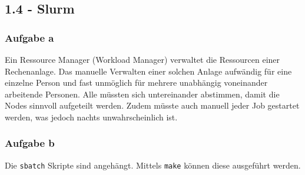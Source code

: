 \subsection*{1.4 - Slurm}

\subsubsection*{Aufgabe a}
Ein Ressource Manager (Workload Manager) verwaltet die Ressourcen einer Rechenanlage. Das manuelle Verwalten einer solchen Anlage aufwändig für eine einzelne Person und fast unmöglich für mehrere unabhängig voneinander arbeitende Personen.
Alle müssten sich untereinander abstimmen, damit die Nodes sinnvoll aufgeteilt werden. Zudem müsste auch manuell jeder Job gestartet werden, was jedoch nachts unwahrscheinlich ist.

\subsubsection*{Aufgabe b}
Die \texttt{sbatch} Skripte sind angehängt. Mittels \texttt{make} können diese ausgeführt werden.
